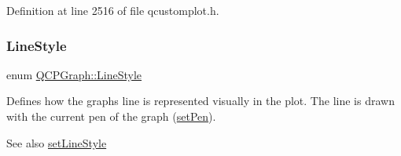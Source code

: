 Definition at line 2516 of file qcustomplot.\+h.

\mbox{\label{class_q_c_p_graph_ad60175cd9b5cac937c5ee685c32c0859}} 
\subsubsection{\texorpdfstring{Line\+Style}{LineStyle}}
{\footnotesize\ttfamily enum \hyperlink{class_q_c_p_graph_ad60175cd9b5cac937c5ee685c32c0859}{Q\+C\+P\+Graph\+::\+Line\+Style}}

Defines how the graph\textquotesingle{}s line is represented visually in the plot. The line is drawn with the current pen of the graph (\hyperlink{class_q_c_p_abstract_plottable_ab74b09ae4c0e7e13142fe4b5bf46cac7}{set\+Pen}). \begin{DoxySeeAlso}{See also}
\hyperlink{class_q_c_p_graph_a513fecccff5b2a50ce53f665338c60ff}{set\+Line\+Style} 
\end{DoxySeeAlso}
